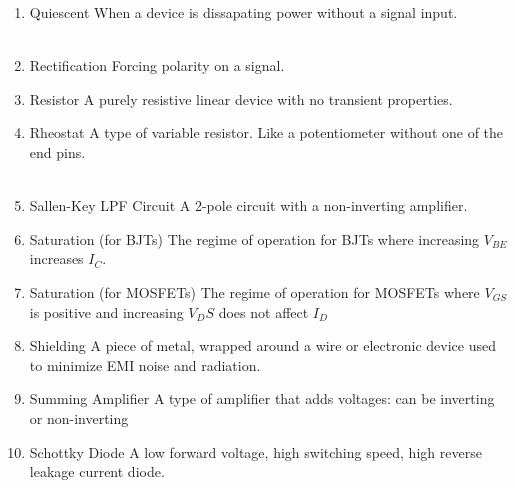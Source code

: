 \documentclass{IEEEtran}
\begin{document}
\begin{enumerate}
\\\\
\item Quiescent
  \subitem When a device is dissapating power without a signal input.\\

\\
\item Rectification
  \subitem Forcing polarity on a signal.\\
\item Resistor
  \subitem A purely resistive linear device with no transient properties.\\
\item Rheostat
  \subitem A type of variable resistor. Like a potentiometer without one of the end pins.\\

\\
\item Sallen-Key LPF Circuit
  \subitem A 2-pole circuit with a non-inverting amplifier. \\                 
\item Saturation (for BJTs)
  \subitem The regime of operation for BJTs where increasing $V_{BE}$ increases $I_C$. \\
\item Saturation (for MOSFETs)
  \subitem The regime of operation for MOSFETs where $V_{GS}$ is positive and increasing ${V_DS}$ does not affect $I_D$ \\
\item Shielding
  \subitem A piece of metal, wrapped around a wire or electronic device used to minimize EMI noise and radiation.
\item Summing Amplifier
  \subitem A type of amplifier that adds voltages: can be inverting or non-inverting \\
\item Schottky Diode
  \subitem A low forward voltage, high switching speed, high reverse leakage current diode. \\


\end{enumerate}
\end{document}
